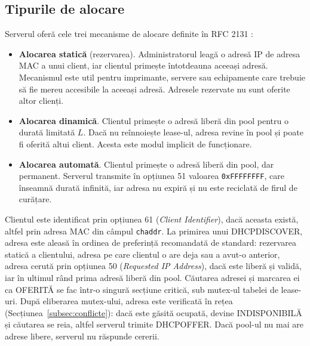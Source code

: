 \documentclass[conference]{IEEEtran}
\begin{document}
\subsection{Tipurile de alocare}\label{subsec:alocare}
Serverul oferă cele trei mecanisme de alocare definite în RFC 2131 \cite{rfc2131}:
\begin{itemize}
\item \textbf{Alocarea statică} (rezervarea). Administratorul leagă o adresă IP de adresa MAC a unui client, iar clientul primește întotdeauna aceeași adresă. Mecanismul este util pentru imprimante, servere sau echipamente care trebuie să fie mereu accesibile la aceeași adresă. Adresele rezervate nu sunt oferite altor clienți.
\item \textbf{Alocarea dinamică}. Clientul primește o adresă liberă din pool pentru o durată limitată $L$. Dacă nu reînnoiește lease-ul, adresa revine în pool și poate fi oferită altui client. Acesta este modul implicit de funcționare.
\item \textbf{Alocarea automată}. Clientul primește o adresă liberă din pool, dar permanent. Serverul transmite în opțiunea 51 valoarea \texttt{0xFFFFFFFF}, care înseamnă durată infinită, iar adresa nu expiră și nu este reciclată de firul de curățare.
\end{itemize}

Clientul este identificat prin opțiunea 61 (\textit{Client Identifier}), dacă aceasta există, altfel prin adresa MAC din câmpul \texttt{chaddr}. La primirea unui DHCPDISCOVER, adresa este aleasă în ordinea de preferință recomandată de standard: rezervarea statică a clientului, adresa pe care clientul o are deja sau a avut-o anterior, adresa cerută prin opțiunea 50 (\textit{Requested IP Address}), dacă este liberă și validă, iar în ultimul rând prima adresă liberă din pool. Căutarea adresei și marcarea ei ca OFERITĂ se fac într-o singură secțiune critică, sub mutex-ul tabelei de lease-uri. După eliberarea mutex-ului, adresa este verificată în rețea (Secțiunea~\ref{subsec:conflicte}): dacă este găsită ocupată, devine INDISPONIBILĂ și căutarea se reia, altfel serverul trimite DHCPOFFER. Dacă pool-ul nu mai are adrese libere, serverul nu răspunde cererii.
\end{document}
